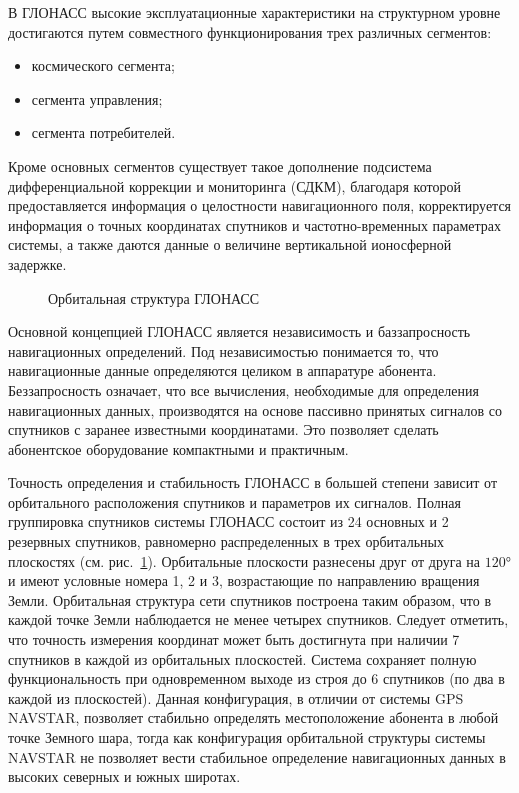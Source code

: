 \documentclass[../main.tex]{subfiles}
\begin{document}
В ГЛОНАСС высокие эксплуатационные характеристики на структурном уровне достигаются путем совместного функционирования трех различных сегментов:
\begin{itemize}
    \item космического сегмента;
    \item сегмента управления;
    \item сегмента потребителей.
\end{itemize}

Кроме основных сегментов существует такое дополнение подсистема дифференциальной коррекции и мониторинга (СДКМ), благодаря которой предоставляется информация о целостности навигационного поля, корректируется информация о точных координатах спутников и частотно-временных параметрах системы, а также даются данные о величине вертикальной ионосферной задержке.

\begin{figure}[htbp]
    \begin{center}


    \caption{Орбитальная структура ГЛОНАСС}
    \label{fig:glonass:pic1}
    \end{center}
\end{figure}

Основной концепцией ГЛОНАСС является независимость и баззапросность навигационных определений. Под независимостью понимается то, что навигационные данные определяются целиком в аппаратуре абонента. Беззапросность означает, что все вычисления, необходимые для определения навигационных данных, производятся на основе пассивно принятых сигналов со спутников с заранее известными координатами. Это позволяет сделать абонентское оборудование компактными и практичным.

Точность определения и стабильность ГЛОНАСС в большей степени зависит от орбитального расположения спутников и параметров их сигналов. Полная группировка спутников системы ГЛОНАСС состоит из 24 основных и 2 резервных спутников, равномерно распределенных в трех орбитальных плоскостях (см. рис.~\ref{fig:glonass:pic1}). Орбитальные плоскости разнесены друг от друга на $\ang{120}$ и имеют условные номера 1, 2 и 3, возрастающие по направлению вращения Земли. Орбитальная структура сети спутников построена таким образом, что в каждой точке Земли наблюдается не менее четырех спутников. Следует отметить, что точность измерения координат может быть достигнута при наличии 7 спутников в каждой из орбитальных плоскостей. Система сохраняет полную функциональность при одновременном выходе из строя до 6 спутников (по два в каждой из плоскостей). Данная конфигурация, в отличии от системы GPS NAVSTAR, позволяет стабильно определять местоположение абонента в любой точке Земного шара, тогда как конфигурация орбитальной структуры системы NAVSTAR не позволяет вести стабильное определение навигационных данных в высоких северных и южных широтах.
\end{document}
